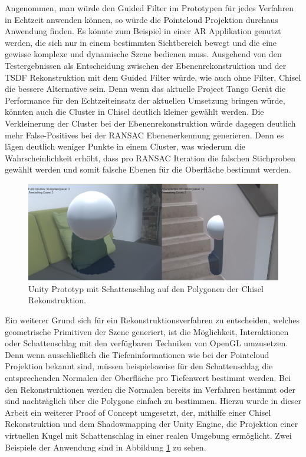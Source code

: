 Angenommen, man würde den Guided Filter im Prototypen für jedes Verfahren in Echtzeit anwenden können, so würde die Pointcloud Projektion durchaus Anwendung finden. Es könnte zum Beispiel in einer AR Applikation genutzt werden, die sich nur in einem bestimmten Sichtbereich bewegt und die eine gewisse komplexe und dynamische Szene bedienen muss. Ausgehend von den Testergebnissen als Entscheidung zwischen der Ebenenrekonstruktion und der TSDF Rekonstruktion mit dem Guided Filter würde, wie auch ohne Filter, Chisel die bessere Alternative sein. Denn wenn das aktuelle Project Tango Gerät die Performance für den Echtzeiteinsatz der aktuellen Umsetzung bringen würde, könnten auch die Cluster in Chisel deutlich kleiner gewählt werden. Die Verkleinerung der Cluster bei der Ebenenrekonstruktion würde dagegen deutlich mehr False-Positives bei der RANSAC Ebenenerkennung generieren. Denn es lägen deutlich weniger Punkte in einem Cluster, was wiederum die Wahrscheinlichkeit erhöht, dass pro RANSAC Iteration die falschen Stichproben gewählt werden und somit falsche Ebenen für die Oberfläche bestimmt werden.

\begin{figure}[h]
  \centering
	\includegraphics[width=1.0\textwidth]{content/images/shadow.png} 
  \caption{Unity Prototyp mit Schattenschlag auf den Polygonen der Chisel Rekonstruktion.}
  \label{fig:shadow}
\end{figure}

Ein weiterer Grund sich für ein Rekonstruktionsverfahren zu entscheiden, welches geometrische Primitiven der Szene generiert, ist die Möglichkeit, Interaktionen oder Schattenschlag mit den verfügbaren Techniken von OpenGL umzusetzen. Denn wenn ausschließlich die Tiefeninformationen wie bei der Pointcloud Projektion bekannt sind, müssen beispielsweise für den Schattenschlag die entsprechenden Normalen der Oberfläche pro Tiefenwert bestimmt werden. Bei den Rekonstruktionen werden die Normalen bereits im Verfahren bestimmt oder sind nachträglich über die Polygone einfach zu bestimmen. Hierzu wurde in dieser Arbeit ein weiterer Proof of Concept umgesetzt, der, mithilfe einer Chisel Rekonstruktion und dem Shadowmapping der Unity Engine, die Projektion einer virtuellen Kugel mit Schattenschlag in einer realen Umgebung ermöglicht. Zwei Beispiele der Anwendung sind in Abbildung \ref{fig:shadow} zu sehen.


